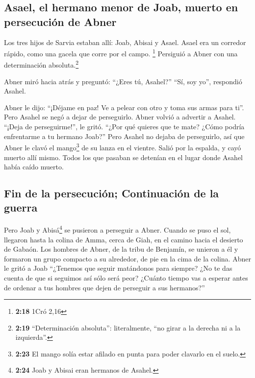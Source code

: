 \hypertarget{asael-el-hermano-menor-de-joab-muerto-en-persecuciuxf3n-de-abner}{%
\subsection{Asael, el hermano menor de Joab, muerto en persecución de
Abner}\label{asael-el-hermano-menor-de-joab-muerto-en-persecuciuxf3n-de-abner}}

 Los tres hijos de Sarvia estaban allí: Joab, Abisai y
Asael. Asael era un corredor rápido, como una gacela que corre por el
campo. \footnote{\textbf{2:18} 1Cró 2,16}  Persiguió a
Abner con una determinación absoluta.\footnote{\textbf{2:19}
  ``Determinación absoluta'': literalmente, ``no girar a la derecha ni a
  la izquierda''.}

 Abner miró hacia atrás y preguntó: ``¿Eres tú, Asahel?''
``Sí, soy yo'', respondió Asahel.

 Abner le dijo: ``¡Déjame en paz! Ve a pelear con otro y
toma sus armas para ti''. Pero Asahel se negó a dejar de perseguirlo.
 Abner volvió a advertir a Asahel. ``¡Deja de
perseguirme!'', le gritó. ``¿Por qué quieres que te mate? ¿Cómo podría
enfrentarme a tu hermano Joab?''  Pero Asahel no dejaba
de perseguirlo, así que Abner le clavó el mango\footnote{\textbf{2:23}
  El mango solía estar afilado en punta para poder clavarlo en el suelo.}
de su lanza en el vientre. Salió por la espalda, y cayó muerto allí
mismo. Todos los que pasaban se detenían en el lugar donde Asahel había
caído muerto.

\hypertarget{fin-de-la-persecuciuxf3n-continuaciuxf3n-de-la-guerra}{%
\subsection{Fin de la persecución; Continuación de la
guerra}\label{fin-de-la-persecuciuxf3n-continuaciuxf3n-de-la-guerra}}

 Pero Joab y Abisá\footnote{\textbf{2:24} Joab y Abisai
  eran hermanos de Asahel.} se pusieron a perseguir a Abner. Cuando se
puso el sol, llegaron hasta la colina de Amma, cerca de Giah, en el
camino hacia el desierto de Gabaón.  Los hombres de
Abner, de la tribu de Benjamín, se unieron a él y formaron un grupo
compacto a su alrededor, de pie en la cima de la colina. 
Abner le gritó a Joab ``¿Tenemos que seguir matándonos para siempre? ¿No
te das cuenta de que si seguimos así sólo será peor? ¿Cuánto tiempo vas
a esperar antes de ordenar a tus hombres que dejen de perseguir a sus
hermanos?''

